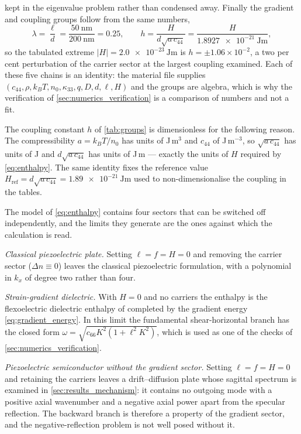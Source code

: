 kept in the eigenvalue problem rather than condensed away.  Finally the
gradient and coupling groups follow from the same numbers,
\begin{equation}
\label{eq:lam_worked}
\lambda=\frac{\ell}{d}=\frac{\SI{50}{\nano\metre}}{\SI{200}{\nano\metre}}=0.25 ,
\qquad
h=\frac{H}{d\sqrt{a\,c_{44}}}=\frac{H}{\SI{1.8927e-21}{\joule\metre}} ,
\end{equation}
so the tabulated extreme $|H|=\SI{2.0e-23}{\joule\metre}$ is
$h=\pm1.06\times10^{-2}$, a two per cent perturbation of the carrier sector at
the largest coupling examined.  Each of these five chains is an identity: the
material file supplies $(c_{44},\rho,k_BT,n_0,\kappa_{33},q,D,d,\ell,H)$ and the
groups are algebra, which is why the verification of
\cref{sec:numerics_verification} is a comparison of numbers and not a fit.

The coupling constant $h$ of \cref{tab:groups} is dimensionless for the
following reason.  The compressibility $a=k_BT/n_0$ has units of J\,m$^3$ and
$c_{44}$ of J\,m$^{-3}$, so $\sqrt{a\,c_{44}}$ has units of J and
$d\sqrt{a\,c_{44}}$ has units of J\,m --- exactly the units of $H$ required by
\eqref{eq:enthalpy}.  The same identity fixes the reference value
$H_{\mathrm{ref}}=d\sqrt{a\,c_{44}}=\SI{1.89e-21}{\joule\metre}$ used to
non-dimensionalise the coupling in the tables.


The model of \eqref{eq:enthalpy} contains four sectors that can be switched off
independently, and the limits they generate are the ones against which the
calculation is read.

\emph{Classical piezoelectric plate.}  Setting $\ell=f=H=0$ and removing the
carrier sector ($\Delta n\equiv0$) leaves the classical piezoelectric
formulation, with a polynomial in $k_x$ of degree two rather than four.

\emph{Strain-gradient dielectric.}  With $H=0$ and no carriers the enthalpy is
the flexoelectric dielectric enthalpy of \cite{shen2010theory} completed by the
gradient energy \eqref{eq:gradient_energy}.  In this limit the fundamental
shear-horizontal branch has the closed form
$\omega=\sqrt{c_{66}K^2(1+\ell^2K^2)}$, which is used as one of the checks of
\cref{sec:numerics_verification}.

\emph{Piezoelectric semiconductor without the gradient sector.}  Setting
$\ell=f=H=0$ and retaining the carriers leaves a drift--diffusion plate whose
sagittal spectrum is examined in \cref{sec:results_mechanism}: it contains no
outgoing mode with a positive axial wavenumber and a negative axial power
apart from the specular reflection.  The backward branch is therefore a property
of the gradient sector, and the negative-reflection problem is not well posed
without it.

